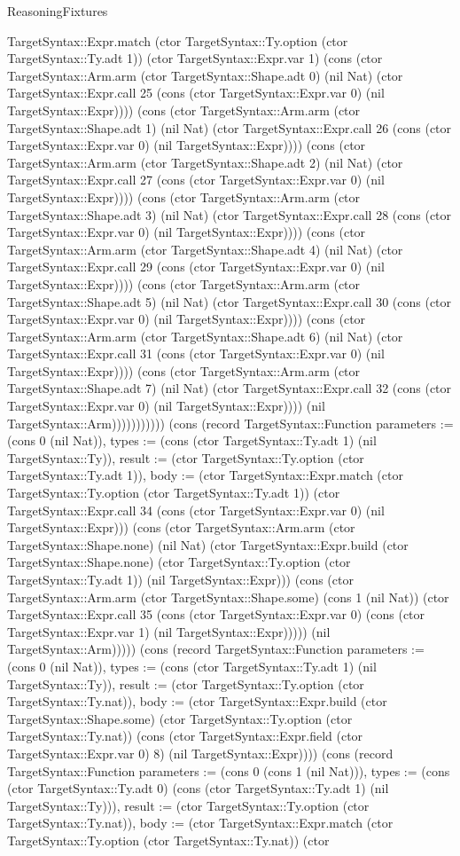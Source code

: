 \begin{lexlean}{ReasoningFixtures}
\begin{semanticmodule}
{TargetSyntax::Expr.match (ctor TargetSyntax::Ty.option (ctor TargetSyntax::Ty.adt 1)) (ctor TargetSyntax::Expr.var 1) (cons (ctor TargetSyntax::Arm.arm (ctor TargetSyntax::Shape.adt 0) (nil Nat) (ctor TargetSyntax::Expr.call 25 (cons (ctor TargetSyntax::Expr.var 0) (nil TargetSyntax::Expr)))) (cons (ctor TargetSyntax::Arm.arm (ctor TargetSyntax::Shape.adt 1) (nil Nat) (ctor TargetSyntax::Expr.call 26 (cons (ctor TargetSyntax::Expr.var 0) (nil TargetSyntax::Expr)))) (cons (ctor TargetSyntax::Arm.arm (ctor TargetSyntax::Shape.adt 2) (nil Nat) (ctor TargetSyntax::Expr.call 27 (cons (ctor TargetSyntax::Expr.var 0) (nil TargetSyntax::Expr)))) (cons (ctor TargetSyntax::Arm.arm (ctor TargetSyntax::Shape.adt 3) (nil Nat) (ctor TargetSyntax::Expr.call 28 (cons (ctor TargetSyntax::Expr.var 0) (nil TargetSyntax::Expr)))) (cons (ctor TargetSyntax::Arm.arm (ctor TargetSyntax::Shape.adt 4) (nil Nat) (ctor TargetSyntax::Expr.call 29 (cons (ctor TargetSyntax::Expr.var 0) (nil TargetSyntax::Expr)))) (cons (ctor TargetSyntax::Arm.arm (ctor TargetSyntax::Shape.adt 5) (nil Nat) (ctor TargetSyntax::Expr.call 30 (cons (ctor TargetSyntax::Expr.var 0) (nil TargetSyntax::Expr)))) (cons (ctor TargetSyntax::Arm.arm (ctor TargetSyntax::Shape.adt 6) (nil Nat) (ctor TargetSyntax::Expr.call 31 (cons (ctor TargetSyntax::Expr.var 0) (nil TargetSyntax::Expr)))) (cons (ctor TargetSyntax::Arm.arm (ctor TargetSyntax::Shape.adt 7) (nil Nat) (ctor TargetSyntax::Expr.call 32 (cons (ctor TargetSyntax::Expr.var 0) (nil TargetSyntax::Expr)))) (nil TargetSyntax::Arm))))))))))}) (cons (record TargetSyntax::Function {parameters := (cons 0 (nil Nat)), types := (cons (ctor TargetSyntax::Ty.adt 1) (nil TargetSyntax::Ty)), result := (ctor TargetSyntax::Ty.option (ctor TargetSyntax::Ty.adt 1)), body := (ctor TargetSyntax::Expr.match (ctor TargetSyntax::Ty.option (ctor TargetSyntax::Ty.adt 1)) (ctor TargetSyntax::Expr.call 34 (cons (ctor TargetSyntax::Expr.var 0) (nil TargetSyntax::Expr))) (cons (ctor TargetSyntax::Arm.arm (ctor TargetSyntax::Shape.none) (nil Nat) (ctor TargetSyntax::Expr.build (ctor TargetSyntax::Shape.none) (ctor TargetSyntax::Ty.option (ctor TargetSyntax::Ty.adt 1)) (nil TargetSyntax::Expr))) (cons (ctor TargetSyntax::Arm.arm (ctor TargetSyntax::Shape.some) (cons 1 (nil Nat)) (ctor TargetSyntax::Expr.call 35 (cons (ctor TargetSyntax::Expr.var 0) (cons (ctor TargetSyntax::Expr.var 1) (nil TargetSyntax::Expr))))) (nil TargetSyntax::Arm))))}) (cons (record TargetSyntax::Function {parameters := (cons 0 (nil Nat)), types := (cons (ctor TargetSyntax::Ty.adt 1) (nil TargetSyntax::Ty)), result := (ctor TargetSyntax::Ty.option (ctor TargetSyntax::Ty.nat)), body := (ctor TargetSyntax::Expr.build (ctor TargetSyntax::Shape.some) (ctor TargetSyntax::Ty.option (ctor TargetSyntax::Ty.nat)) (cons (ctor TargetSyntax::Expr.field (ctor TargetSyntax::Expr.var 0) 8) (nil TargetSyntax::Expr)))}) (cons (record TargetSyntax::Function {parameters := (cons 0 (cons 1 (nil Nat))), types := (cons (ctor TargetSyntax::Ty.adt 0) (cons (ctor TargetSyntax::Ty.adt 1) (nil TargetSyntax::Ty))), result := (ctor TargetSyntax::Ty.option (ctor TargetSyntax::Ty.nat)), body := (ctor TargetSyntax::Expr.match (ctor TargetSyntax::Ty.option (ctor TargetSyntax::Ty.nat)) (ctor }
\end{semanticmodule}
\end{lexlean}
